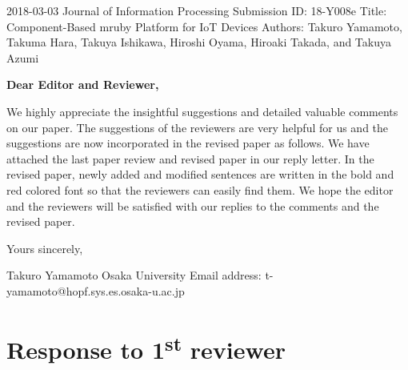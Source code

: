 \documentclass{article}
\newcommand\st{\textsuperscript{st}\xspace}
\begin{document}
\begin{flushleft}
  2018-03-03\newline 
  Journal of Information Processing\newline
  Submission ID: 18-Y008e\newline
  Title: Component-Based mruby Platform for IoT Devices\newline
  Authors: Takuro Yamamoto, Takuma Hara, Takuya Ishikawa, Hiroshi Oyama, Hiroaki Takada, and Takuya Azumi\newline
\end{flushleft}

\textbf{Dear Editor and Reviewer,}\newline

We highly appreciate the insightful suggestions and detailed valuable comments on our paper.
The suggestions of the reviewers are very helpful for us and the suggestions are now incorporated in the revised paper as follows.
We have attached the last paper review and revised paper in our reply letter.
In the revised paper, newly added and modified sentences are written in the bold and red colored font so that the reviewers can easily find them.
We hope the editor and the reviewers will be satisfied with our replies to the comments and the revised paper.
\newline\newline

\begin{flushleft}
  Yours sincerely,\newline

  Takuro Yamamoto\newline
  Osaka University\newline
  Email address: t-yamamoto@hopf.sys.es.osaka-u.ac.jp\newline
\end{flushleft}

\clearpage

\section{Response to 1\st reviewer}
\end{document}
